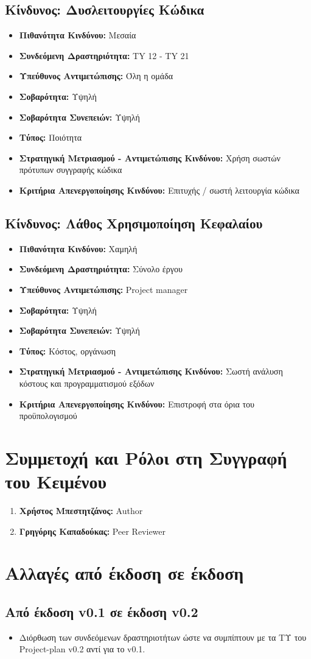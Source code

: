 \documentclass[12pt,a4paper]{article}
\begin{document}
\subsection{Κίνδυνος: Δυσλειτουργίες Κώδικα}
\begin{itemize}
	\item \textbf{Πιθανότητα Κινδύνου:} Μεσαία
	\item \textbf{Συνδεόμενη Δραστηριότητα:} TY 12 - TY 21
	\item \textbf{Υπεύθυνος Αντιμετώπισης:} Όλη η ομάδα
	\item \textbf{Σοβαρότητα:} Υψηλή
	\item \textbf{Σοβαρότητα Συνεπειών:} Υψηλή
	\item \textbf{Τύπος:} Ποιότητα
	\item \textbf{Στρατηγική Μετριασμού - Αντιμετώπισης Κινδύνου:} Χρήση σωστών πρότυπων συγγραφής κώδικα
	\item \textbf{Κριτήρια Απενεργοποίησης Κινδύνου:} Επιτυχής / σωστή λειτουργία κώδικα
\end{itemize}

\subsection{Κίνδυνος: Λάθος Χρησιμοποίηση Κεφαλαίου}
\begin{itemize}
	\item \textbf{Πιθανότητα Κινδύνου:} Χαμηλή
	\item \textbf{Συνδεόμενη Δραστηριότητα:} Σύνολο έργου
	\item \textbf{Υπεύθυνος Αντιμετώπισης:} Project manager
	\item \textbf{Σοβαρότητα:} Υψηλή
	\item \textbf{Σοβαρότητα Συνεπειών:} Υψηλή
	\item \textbf{Τύπος:} Κόστος, οργάνωση
	\item \textbf{Στρατηγική Μετριασμού - Αντιμετώπισης Κινδύνου:} Σωστή ανάλυση κόστους και προγραμματισμού εξόδων 
	\item \textbf{Κριτήρια Απενεργοποίησης Κινδύνου:} Επιστροφή στα όρια του προϋπολογισμού
\end{itemize}

\section{Συμμετοχή και Ρόλοι στη Συγγραφή του Κειμένου}
\begin{enumerate}
	\item \textbf{Χρήστος Μπεστητζάνος:} Author
	\item \textbf{Γρηγόρης Καπαδούκας:} Peer Reviewer
\end{enumerate}

\section{Αλλαγές από έκδοση σε έκδοση}

\subsection{Από έκδοση v0.1 σε έκδοση v0.2}
\begin{itemize}
    \item Διόρθωση των συνδεόμενων δραστηριοτήτων ώστε να συμπίπτουν με τα ΤΥ του Project-plan v0.2 αντί για το v0.1.
\end{itemize}
\end{document}
